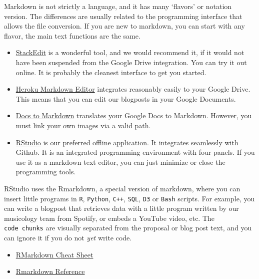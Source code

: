 \documentclass[
  fontsize=13pt,
  english,
  a4paper,
  openany, a4paper, oneside]{book}
\providecommand{\tightlist}{%
  \setlength{\itemsep}{0pt}\setlength{\parskip}{0pt}}
\begin{document}
Markdown is not strictly a language, and it has many `flavors' or notation version. The differences are usually related to the programming interface that allows the file conversion. If you are new to markdown, you can start with any flavor, the main text functions are the same.

\begin{itemize}
\item
  \href{https://stackedit.io/}{StackEdit} is a wonderful tool, and we would recommend it, if it would not have been suspended from the Google Drive integration. You can try it out online. It is probably the cleanest interface to get you started.
\item
  \href{https://thumbsdb.herokuapp.com/markdown/}{Heroku Markdown Editor} integrates reasonably easily to your Google Drive. This means that you can edit our blogposts in your Google Documents.
\item
  \href{https://gsuite.google.com/marketplace/app/docs_to_markdown/700168918607}{Docs to Markdown} translates your Google Docs to Markdown. However, you must link your own images via a valid path.
\item
  \href{https://rstudio.com/}{RStudio} is our preferred offline application. It integrates seamlessly with Github. It is an integrated programming environment with four panels. If you use it as a markdown text editor, you can just minimize or close the programming tools.
\end{itemize}

RStudio uses the Rmarkdown, a special version of markdown, where you can insert little programs in \texttt{R}, \texttt{Python}, \texttt{C++}, \texttt{SQL}, \texttt{D3} or \texttt{Bash} scripts. For example, you can write a blogpost that retrieves data with a little program written by our musicology team from Spotify, or embeds a YouTube video, etc. The \texttt{code\ chunks} are visually separated from the proposal or blog post text, and you can ignore it if you do not \emph{yet} write code.

\begin{itemize}
\tightlist
\item
  \href{https://rstudio.com/wp-content/uploads/2016/03/rmarkdown-cheatsheet-2.0.pdf?_ga=2.126386957.1623649708.1603024238-59012930.1603024238}{RMarkdown Cheat Sheet}
\item
  \href{https://rstudio.com/wp-content/uploads/2015/03/rmarkdown-reference.pdf?_ga=2.68348561.1623649708.1603024238-59012930.1603024238}{Rmarkdown Reference}
\end{itemize}
\end{document}
